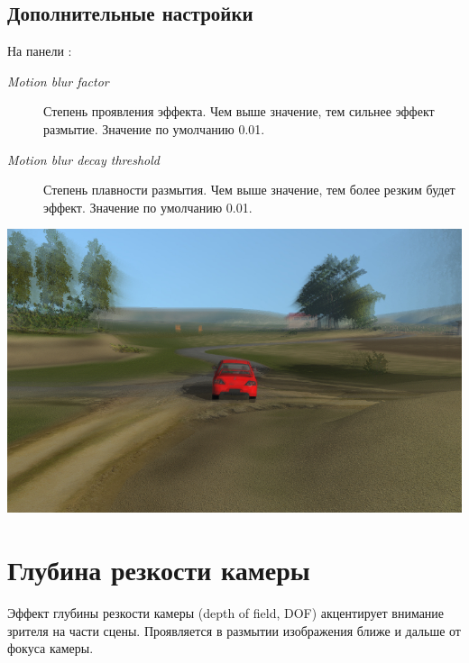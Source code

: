 \documentclass[a4paper,12pt,oneside]{sphinxmanual}
\begin{document}
\subsection{Дополнительные настройки}
\label{postprocessing_effects:id4}
На панели :
\begin{description}
\item[{\emph{Motion blur factor}}] \leavevmode
Степень проявления эффекта. Чем выше значение, тем сильнее эффект размытие. Значение по умолчанию 0.01.

\item[{\emph{Motion blur decay threshold}}] \leavevmode
Степень плавности размытия. Чем выше значение, тем более резким будет эффект. Значение по умолчанию 0.01.

\end{description}

{\hfill\includegraphics[width=1.000\linewidth]{motion_blur.jpg}\hfill}

\begin{DUlineblock}{0em}
\item[] 
\end{DUlineblock}


\section{Глубина резкости камеры}
\label{postprocessing_effects:id5}\label{postprocessing_effects:dof}\label{postprocessing_effects:index-1}
Эффект глубины резкости камеры (depth of field, DOF) акцентирует внимание зрителя на части сцены. Проявляется в размытии изображения ближе и дальше от фокуса камеры.
\end{document}
